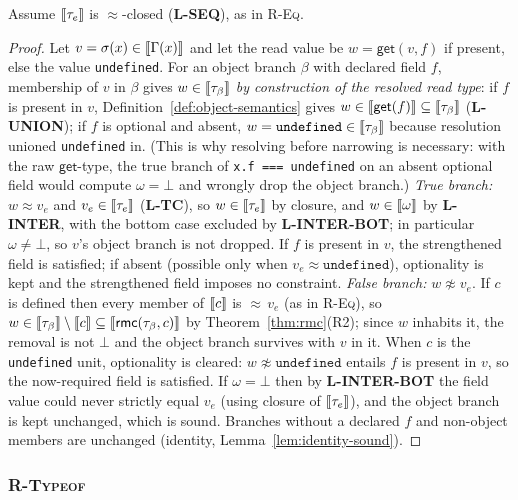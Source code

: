 \documentclass[11pt]{article}
\newcommand{\Env}{\Gamma}
\begin{document}
\begin{lemma}
\label{lem:r-eqfield-sound}
Assume $\llbracket \tau_e \rrbracket$ is $\approx$-closed (\textbf{L-SEQ}), as in
\textsc{R-Eq}.
\end{lemma}
\begin{proof}
Let $v = \sigma(x) \in \sem{\Env(x)}$ and let the read value be
$w = \mathsf{get}(v, f)$ if present, else the value \texttt{undefined}.
For an object branch $\beta$ with declared field $f$, membership of $v$ in $\beta$
gives $w \in \llbracket \tau_\beta \rrbracket$ \emph{by construction of the resolved read
type}: if $f$ is present in $v$, Definition~\ref{def:object-semantics} gives
$w \in \llbracket \mathsf{get}(f) \rrbracket \subseteq \llbracket \tau_\beta \rrbracket$ (\textbf{L-UNION});
if $f$ is optional and absent,
$w = \texttt{undefined} \in \llbracket \tau_\beta \rrbracket$ because resolution unioned
\texttt{undefined} in. (This is why resolving before narrowing is
necessary: with the raw $\mathsf{get}$-type, the true branch of
\texttt{x.f === undefined} on an absent optional field would compute
$\omega = \bot$ and wrongly drop the object branch.)
\emph{True branch:} $w \approx v_e$ and $v_e \in \llbracket \tau_e \rrbracket$
(\textbf{L-TC}), so $w \in \llbracket \tau_e \rrbracket$ by closure, and
$w \in \llbracket \omega \rrbracket$ by \textbf{L-INTER}, with the bottom case excluded by
\textbf{L-INTER-BOT}; in particular $\omega \neq \bot$,
so $v$'s object branch is not dropped. If $f$ is present in $v$, the strengthened
field is satisfied; if absent (possible only when
$v_e \approx \texttt{undefined}$), optionality is kept and the strengthened
field imposes no constraint.
\emph{False branch:} $w \not\approx v_e$. If $c$ is defined then
every member of $\llbracket c \rrbracket$ is ${\approx}\,v_e$ (as in \textsc{R-Eq}), so
$w \in \llbracket \tau_\beta \rrbracket\setminus\llbracket c \rrbracket
\subseteq \llbracket \mathsf{rmc}(\tau_\beta, c) \rrbracket$ by Theorem~\ref{thm:rmc}(R2);
since $w$ inhabits it, the removal is not $\bot$ and the object branch survives
with $v$ in it. When $c$ is the \texttt{undefined} unit, optionality is
cleared: $w \not\approx \texttt{undefined}$ entails $f$ is present in $v$,
so the now-required field is satisfied.
If $\omega = \bot$ then by \textbf{L-INTER-BOT} the field value could never
strictly equal $v_e$ (using closure of $\llbracket \tau_e \rrbracket$), and the object branch is
kept unchanged, which is sound. Branches without a declared $f$ and
non-object members are unchanged (identity,
Lemma~\ref{lem:identity-sound}).
\end{proof}

\subsubsection{\textsc{R-Typeof}}
\label{sec:r-typeof}
\end{document}
